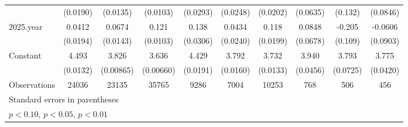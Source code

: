 \begin{table}[htbp]
\begin{tabular}{l*{9}{c}}
                    &    (0.0190)         &    (0.0135)         &    (0.0103)         &    (0.0293)         &    (0.0248)         &    (0.0202)         &    (0.0635)         &     (0.132)         &    (0.0846)         \\
[1em]
2025.year           &      0.0412\sym{**} &      0.0674\sym{***}&       0.121\sym{***}&       0.138\sym{***}&      0.0434\sym{*}  &       0.118\sym{***}&      0.0848         &      -0.205\sym{*}  &     -0.0606         \\
                    &    (0.0194)         &    (0.0143)         &    (0.0103)         &    (0.0306)         &    (0.0240)         &    (0.0199)         &    (0.0678)         &     (0.109)         &    (0.0903)         \\
[1em]
Constant            &       4.493\sym{***}&       3.826\sym{***}&       3.636\sym{***}&       4.429\sym{***}&       3.792\sym{***}&       3.732\sym{***}&       3.940\sym{***}&       3.793\sym{***}&       3.775\sym{***}\\
                    &    (0.0132)         &   (0.00865)         &   (0.00660)         &    (0.0191)         &    (0.0160)         &    (0.0133)         &    (0.0456)         &    (0.0725)         &    (0.0420)         \\
\hline
Observations        &       24036         &       23135         &       35765         &        9286         &        7004         &       10253         &         768         &         506         &         456         \\
\hline\hline
\multicolumn{10}{l}{\footnotesize Standard errors in parentheses}\\
\multicolumn{10}{l}{\footnotesize \sym{*} \(p<0.10\), \sym{**} \(p<0.05\), \sym{***} \(p<0.01\)}\\
\end{tabular}
\end{table}
